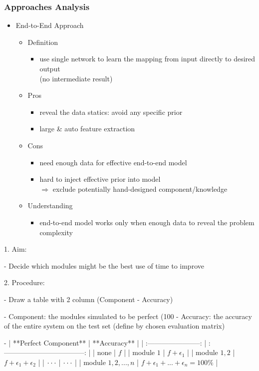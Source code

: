 \subsubsection{Approaches Analysis}
\begin{itemize}
\item End-to-End Approach
	\begin{itemize}
	\item Definition
		\begin{itemize}
		\item use single network to learn the mapping from input directly to desired output \\
		(no intermediate result)
		\end{itemize}
	\item Pros
		\begin{itemize}
		\item reveal the data statics: avoid any specific prior
		\item large \& auto feature extraction
		\end{itemize}
	\item Cons
		\begin{itemize}
		\item need enough data for effective end-to-end model
		\item hard to inject effective prior into model \\
		$\Rightarrow$ exclude potentially hand-designed component/knowledge
		\end{itemize}
	\item Understanding
		\begin{itemize}
		\item end-to-end model works only when enough data to reveal the problem complexity
		\end{itemize}
	\end{itemize}
\end{itemize}

1. Aim:

- Decide which modules might be the best use of time to improve

2. Procedure:

- Draw a table with 2 column (Component - Accuracy)

- Component: the modules simulated to be perfect (100%
- Accuracy: the accuracy of the entire system on the test set (define by chosen evaluation matrix)

- |   **Perfect Component**   |             **Accuracy**              |
| :-----------------------: | :-----------------------------------: |
|           none            |                  $f$                  |
|        module $1$         |            $f+\epsilon_1$             |
|       module $1,2$        |       $f+\epsilon_1+\epsilon_2$       |
| $\cdot \\ \cdot \\ \cdot$ |       $\cdot \\ \cdot \\ \cdot$       |
|    module $1,2,...,n$     | $f+\epsilon_1+...+\epsilon_n = 100\%$ |

